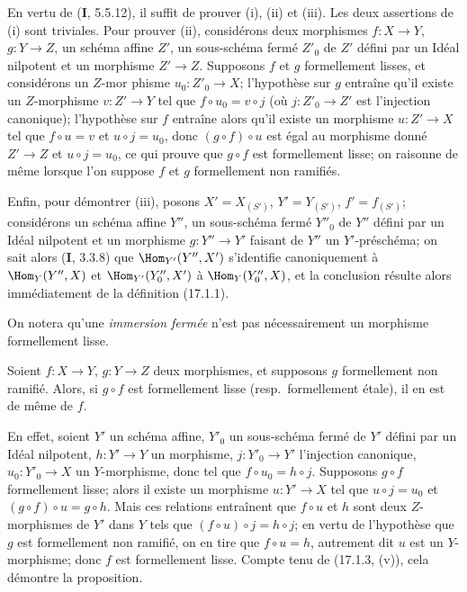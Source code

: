 En vertu de (\textbf{I}, 5.5.12), il suffit de prouver (i), (ii) et (iii). Les deux assertions de (i) sont triviales. Pour prouver (ii), considérons deux morphismes $f:X\to Y$, $g:Y\to Z$, un schéma affine $Z'$, un sous-schéma fermé $Z'_0$ de $Z'$ défini par un Idéal nilpotent et un morphisme $Z'\to Z$. Supposons $f$ et $g$ formellement lisses, et considérons un
$Z$-mor%
phisme $u_0:Z'_0\to X$; l'hypothèse sur $g$ entraîne qu'il existe un $Z$-morphisme $v:Z'\to Y$ tel que $f\circ u_0=v\circ j$ (où $j:Z'_0\to Z'$ est l'injection canonique); l'hypothèse sur $f$ entraîne alors qu'il existe un morphisme $u:Z'\to X$ tel que $f\circ u=v$ et $u\circ j=u_0$, donc $(g\circ f)\circ u$ est égal au morphisme donné $Z'\to Z$ et $u\circ j=u_0$, ce qui prouve que $g\circ f$ est formellement lisse; on raisonne de même lorsque l'on suppose $f$ et $g$ formellement non ramifiés.

Enfin, pour démontrer (iii), posons $X'=X_{(S')}$, $Y'=Y_{(S')}$, $f'=f_{(S')}$; considérons un schéma affine $Y''$, un sous-schéma fermé $Y''_0$ de $Y''$ défini par un Idéal nilpotent et un morphisme $g:Y''\to Y'$ faisant de $Y''$ un $Y'$-préschéma; on sait alors (\textbf{I}, 3.3.8) que $\Hom_{Y'}(Y'',X')$ s'identifie canoniquement à $\Hom_Y(Y'',X)$ et $\Hom_{Y'}(Y''_0,X')$ à $\Hom_Y(Y''_0,X)$, et la conclusion résulte alors immédiatement de la définition (17.1.1).

On notera qu'une \emph{immersion fermée} n'est pas nécessairement un morphisme formellement lisse.

\begin{proposition}[17.1.4]
\label{IV.17.1.4}
Soient $f:X\to Y$, $g:Y\to Z$ deux morphismes, et supposons $g$ formellement non ramifié. Alors, si $g\circ f$ est formellement lisse \textup{(resp.}\ formellement étale\textup{)}, il en est de même de $f$.
\end{proposition}

En effet, soient $Y'$ un schéma affine, $Y'_0$ un sous-schéma fermé de $Y'$ défini par un Idéal nilpotent, $h:Y'\to Y$ un morphisme, $j:Y'_0\to Y'$ l'injection canonique, $u_0:Y'_0\to X$ un $Y$-morphisme, donc tel que $f\circ u_0=h\circ j$. Supposons $g\circ f$ formellement lisse; alors il existe un morphisme $u:Y'\to X$ tel que $u\circ j=u_0$ et $(g\circ f)\circ u=g\circ h$. Mais ces relations entraînent que $f\circ u$ et $h$ sont deux $Z$-morphismes de $Y'$ dans $Y$ tels que $(f\circ u)\circ j=h\circ j$; en vertu de l'hypothèse que $g$ est formellement non ramifié, on en tire que $f\circ u=h$, autrement dit $u$ est un $Y$-morphisme; donc $f$ est formellement lisse. Compte tenu de (17.1.3, (v)), cela démontre la proposition.

